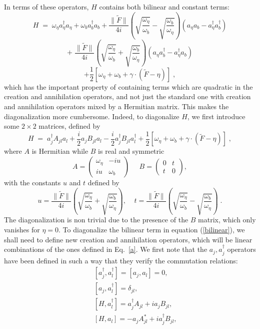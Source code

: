 \documentclass[a4paper,12pt]{article}
\newcommand{\Fd}{\widetilde{F}}
\newcommand{\n}{\eta}
\newcommand{\w}{\omega}
\begin{document}
In terms of these operators, $H$ contains both bilinear and constant
terms:
$$
H \;=\; \w_\n a_\n^\dagger a_\n + \w_b a_b^\dagger a_b +
\frac{\|\Fd\|}{4i}(\sqrt{\frac{\w_\n}{\w_b}}-\sqrt{\frac{\w_b}{\w_\n}})
(a_\n a_b - a_\n^\dagger a_b^\dagger)
$$
$$
+\;\frac{\|\Fd\|}
{4i}(\sqrt{\frac{\w_\n}{\w_b}}+\sqrt{\frac{\w_b}{\w_\n}}) (a_\n a_b^\dagger
- a_\n^\dagger a_b)
$$
\begin{equation}
\label{Ha}
+ \frac{1}{2}[\w_\n + \w_b + \gamma \cdot (\Fd-\n)]\;,
\end{equation}
which has the important property of containing terms which are
quadratic in the creation and annihilation operators, and not just the
standard one with creation and annihilation operators mixed by a
Hermitian matrix. This makes the diagonalization more cumbersome.
Indeed, to diagonalize $H$, we first introduce some $2\times2$ matrices,
defined by
\begin{equation}\label{bilinear}
H\;=\;a_j^\dagger A_{jl} a_l + \frac{i}{2} a_j B_{jl} a_l -
\frac{i}{2} a_j^\dagger B_{jl} a_l^\dagger +  \frac{1}{2}[\w_\n +
\w_b + \gamma \cdot (\Fd-\n)]\;,
\end{equation}
where $A$ is Hermitian while $B$ is real and symmetric
\begin{equation}\label{matrices}
A= \left(
\begin{array}{cc}
  \w_\n & -iu \\
  iu   & \w_b
\end{array}
\right) \;\;\;\;\; B= \left(
\begin{array}{cc}
  0 & t \\
  t & 0
\end{array}
\right),
\end{equation}
with the constants $u$ and $t$ defined by
\begin{equation}\label{ut}
u=\frac{\|\Fd\|}{4i}(\sqrt{\frac{\w_\n}{\w_b}}+\sqrt{\frac{\w_b}{\w_\n}}),\;\;\;\;
t=\frac{\|\Fd\|}{4i}(\sqrt{\frac{\w_\n}{\w_b}}-\sqrt{\frac{\w_b}{\w_\n}})\;.
\end{equation}
The diagonalization is non trivial due to the presence of the $B$
matrix, which only vanishes for $\eta=0$.  To diagonalize the bilinear
term in equation (\ref{bilinear}), we shall need to define new
creation and annihilation operators, which will be linear combinations
of the ones defined in Eq.~\ref{a}. We first note that the $a_j,
a_j^\dagger$ operators have been defined in such a way that they verify the
commutation relations:
\begin{eqnarray}\label{aconmutacion}
& &[a_j^\dagger,a_l^\dagger]=[a_j,a_l]=0, \nonumber\\ &
&[a_j,a_l^\dagger]=\delta_{jl}, \nonumber\\ &
&[H,a_l^\dagger]=a_j^\dagger A_{jl} + i a_j B_{jl}, \nonumber\\ &
&[H,a_l]=-a_j A^*_{jl} + i a_j^\dagger B_{jl},
\end{eqnarray}
\end{document}
